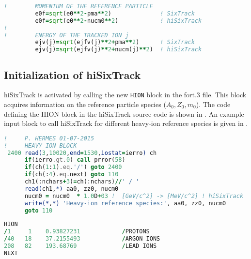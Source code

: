 \begin{minipage}{\linewidth}
\begin{lstlisting}[language=Fortran,caption=Definition of the reference momentum in SixTrack and hiSixTrack.,label=listing_einstein]
!        MOMENTUM OF THE REFERENCE PARTICLE
         e0f=sqrt(e0**2-pma**2)              ! SixTrack
         e0f=sqrt(e0**2-nucm0**2)            ! hiSixTrack
!
!        ENERGY OF THE TRACKED ION j
         ejv(j)=sqrt(ejfv(j)**2+pma**2)      ! SixTrack
         ejv(j)=sqrt(ejfv(j)**2+nucm(j)**2)  ! hiSixTrack
\end{lstlisting}
\end{minipage}

\subsection{Initialization of hiSixTrack}

hiSixTrack is activated by calling the new \lstinline{HION} block in the fort.3 file. This block acquires information on the reference particle species ($A_0,Z_0,m_0$). The code defining the HION block in the hiSixTrack source code is shown in . An example input block to call hiSixTrack for different heavy-ion reference species is given in .


\vspace{0.5cm}
\begin{minipage}{\linewidth}
\begin{lstlisting}[language=Fortran,caption=Definition of the information acquisition from the \lstinline{fort.3} in the hiSixTrack source file.,label=lst:hion_src]
!     P. HERMES 01-07-2015
!     HEAVY ION BLOCK
 2400 read(3,10020,end=1530,iostat=ierro) ch
      if(ierro.gt.0) call prror(58)
      if(ch(1:1).eq.'/') goto 2400
      if(ch(:4).eq.next) goto 110
      ch1(:nchars+3)=ch(:nchars)//' / '
      read(ch1,*) aa0, zz0, nucm0
      nucm0 = nucm0  * 1.0D+03 !  [GeV/c^2] -> [MeV/c^2] ! hiSixTrack
      write(*,*) 'Heavy-ion reference species:', aa0, zz0, nucm0
      goto 110
\end{lstlisting}
\end{minipage}


\vspace{0.5cm}
\begin{minipage}{\linewidth}
\begin{lstlisting}[language=Fortran,caption={New heavy-ion block in the fort.3 file to activate hiSixTrack. In the given example, the chosen reference ion species is \lead. Lines starting with '/' are commented out.}, label={lst:f3hi}]
HION
/1     1    0.93827231            /PROTONS
/40   18    37.2155493            /ARGON IONS
208   82    193.68769             /LEAD IONS
NEXT
\end{lstlisting}
\end{minipage}


